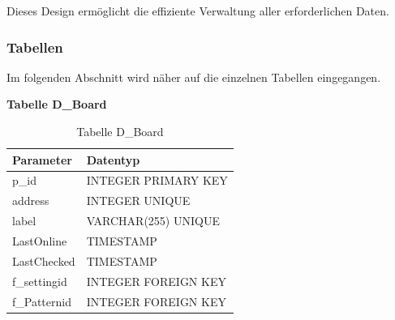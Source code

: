 Dieses Design ermöglicht die effiziente Verwaltung aller erforderlichen Daten. 

\newpage
\subsubsection{Tabellen}
Im folgenden Abschnitt wird näher auf die einzelnen Tabellen eingegangen. 


\textbf{Tabelle D\_Board}\\

\begin{table}[H]
\begin{center}
\begin{tabular}{|l|l|}\hline
Parameter & Datentyp \\ \hline
p\_id & INTEGER PRIMARY KEY\\ 
address & INTEGER UNIQUE\\ 
label & VARCHAR(255) UNIQUE\\ 
LastOnline & TIMESTAMP\\ 
LastChecked & TIMESTAMP\\ 
f\_settingid & INTEGER FOREIGN KEY\\
f\_Patternid & INTEGER FOREIGN KEY\\ \hline
\end{tabular}
\caption{Tabelle D\_Board}
\label{table_TabelleD_Board}
\end{center}
\end{table}


